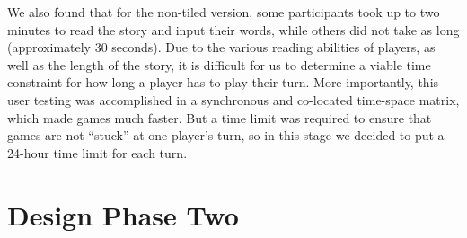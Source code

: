 \documentclass{sigchi}
\begin{document}
We also found that for the non-tiled version, some participants took up to two minutes to read the story and input their words, while others did not take as long (approximately 30 seconds). Due to the various reading abilities of players, as well as the length of the story, it is difficult for us to determine a viable time constraint for how long a player has to play their turn. More importantly, this user testing was accomplished in a synchronous and co-located time-space matrix, which made games much faster. But a time limit was required to ensure that games are not ``stuck'' at one player's turn, so in this stage we decided to put a 24-hour time limit for each turn.
\newline

\section{Design Phase Two}
\end{document}
